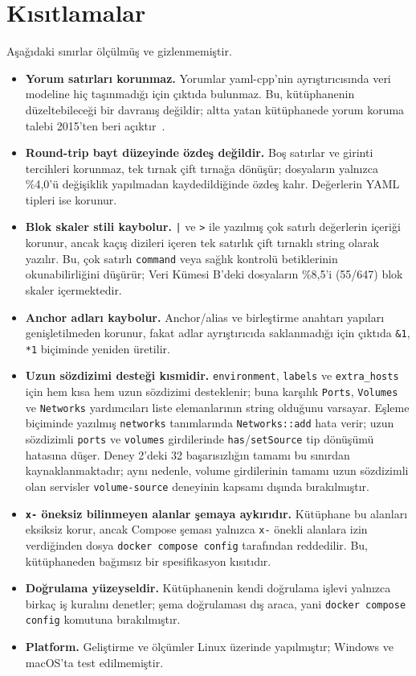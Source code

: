 \documentclass[conference]{IEEEtran}
\begin{document}
\section{Kısıtlamalar}
\label{sec:kisitlamalar}

Aşağıdaki sınırlar ölçülmüş ve gizlenmemiştir.

\begin{itemize}
  \item \textbf{Yorum satırları korunmaz.} Yorumlar yaml-cpp'nin
    ayrıştırıcısında veri modeline hiç taşınmadığı için çıktıda bulunmaz.
    Bu, kütüphanenin düzeltebileceği bir davranış değildir; altta yatan
    kütüphanede yorum koruma talebi 2015'ten beri açıktır~\cite{yamlcpp_issue154}.
  \item \textbf{Round-trip bayt düzeyinde özdeş değildir.} Boş satırlar ve
    girinti tercihleri korunmaz, tek tırnak çift tırnağa dönüşür;
    dosyaların yalnızca \%4,0'ü değişiklik yapılmadan kaydedildiğinde
    özdeş kalır. Değerlerin YAML tipleri ise korunur.
  \item \textbf{Blok skaler stili kaybolur.} \texttt{|} ve \texttt{>}
    ile yazılmış çok satırlı değerlerin içeriği korunur, ancak kaçış
    dizileri içeren tek satırlık çift tırnaklı string olarak yazılır. Bu,
    çok satırlı \texttt{command} veya sağlık kontrolü betiklerinin
    okunabilirliğini düşürür; Veri Kümesi B'deki dosyaların \%8,5'i (55/647)
    blok skaler içermektedir.
  \item \textbf{Anchor adları kaybolur.} Anchor/alias ve birleştirme
    anahtarı yapıları genişletilmeden korunur, fakat adlar ayrıştırıcıda
    saklanmadığı için çıktıda \texttt{\&1}, \texttt{*1} biçiminde yeniden
    üretilir.
  \item \textbf{Uzun sözdizimi desteği kısmidir.} \texttt{environment},
    \texttt{labels} ve \texttt{extra\_hosts} için hem kısa hem uzun
    sözdizimi desteklenir; buna karşılık \texttt{Ports}, \texttt{Volumes}
    ve \texttt{Networks} yardımcıları liste elemanlarının string olduğunu
    varsayar. Eşleme biçiminde yazılmış \texttt{networks} tanımlarında
    \texttt{Networks::add} hata verir; uzun sözdizimli \texttt{ports} ve
    \texttt{volumes} girdilerinde \texttt{has}/\texttt{setSource} tip
    dönüşümü hatasına düşer. Deney 2'deki 32 başarısızlığın tamamı bu
    sınırdan kaynaklanmaktadır; aynı nedenle, volume girdilerinin tamamı
    uzun sözdizimli olan servisler \texttt{volume-source} deneyinin
    kapsamı dışında bırakılmıştır.
  \item \textbf{\texttt{x-} öneksiz bilinmeyen alanlar şemaya aykırıdır.}
    Kütüphane bu alanları eksiksiz korur, ancak Compose şeması yalnızca
    \texttt{x-} önekli alanlara izin verdiğinden dosya
    \texttt{docker compose config} tarafından reddedilir. Bu, kütüphaneden
    bağımsız bir spesifikasyon kısıtıdır.
  \item \textbf{Doğrulama yüzeyseldir.} Kütüphanenin kendi doğrulama
    işlevi yalnızca birkaç iş kuralını denetler; şema doğrulaması dış
    araca, yani \texttt{docker compose config} komutuna bırakılmıştır.
  \item \textbf{Platform.} Geliştirme ve ölçümler Linux üzerinde
    yapılmıştır; Windows ve macOS'ta test edilmemiştir.
\end{itemize}
\end{document}
